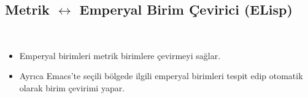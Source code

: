 \documentclass[a4paper, 9pt]{extarticle}
\begin{document}

\subsection{Metrik $\longleftrightarrow$ Emperyal Birim Çevirici (ELisp)}
\hfill \\
\begin{itemize}
\item Emperyal birimleri metrik birimlere çevirmeyi sağlar.
\item Ayrıca Emacs'te seçili bölgede ilgili emperyal birimleri tespit edip
	otomatik olarak birim çevirimi yapar.
\end{itemize}

\mydiller{}
\myteknikbecerilerb{}
\myhobilerb{}

\end{document}

